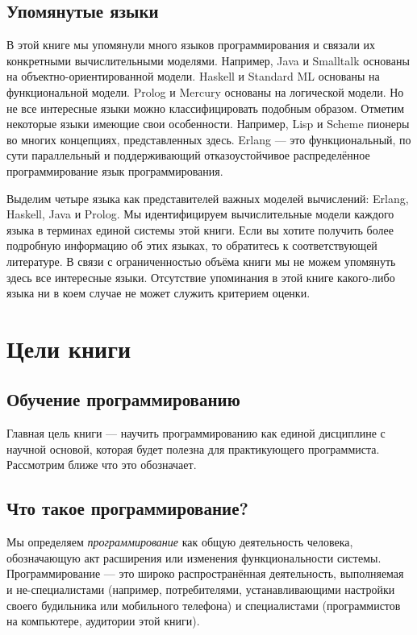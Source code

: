 \subsection*{Упомянутые языки}

В этой книге мы упомянули много языков программирования и связали их конкретными вычислительными моделями. Например, Java и Smalltalk основаны на объектно-ориентированной модели. {Haskell} и { Standard ML} основаны на функциональной модели. Prolog и Mercury основаны на логической модели. Но не все интересные языки можно классифицировать подобным образом. Отметим некоторые языки имеющие свои особенности. Например, Lisp и Scheme пионеры во многих концепциях, представленных здесь. Erlang --- это функциональный, по сути параллельный и поддерживающий отказоустойчивое распределённое программирование язык программирования.

Выделим четыре языка как представителей важных моделей вычислений: Erlang, Haskell, Java и Prolog. Мы идентифицируем вычислительные модели каждого языка в терминах единой системы этой книги. Если вы хотите получить более подробную информацию об этих языках, то обратитесь к соответствующей литературе. В связи с ограниченностью объёма книги мы не можем упомянуть здесь все интересные языки. Отсутствие упоминания в этой книге какого-либо языка ни в коем случае не может служить критерием оценки.

\section*{Цели книги}

\subsection*{Обучение программированию}

Главная цель книги --- научить программированию как единой дисциплине с научной основой, которая будет полезна для практикующего программиста. Рассмотрим ближе что это обозначает.

\subsection*{Что такое программирование?}

Мы определяем \emph{программирование} как общую деятельность человека, обозначающую акт расширения или изменения функциональности системы. Программирование --- это широко распространённая деятельность, выполняемая и не-специалистами (например, потребителями, устанавливающими настройки своего будильника или мобильного телефона) и специалистами (программистов на компьютере, аудитории этой книги).


